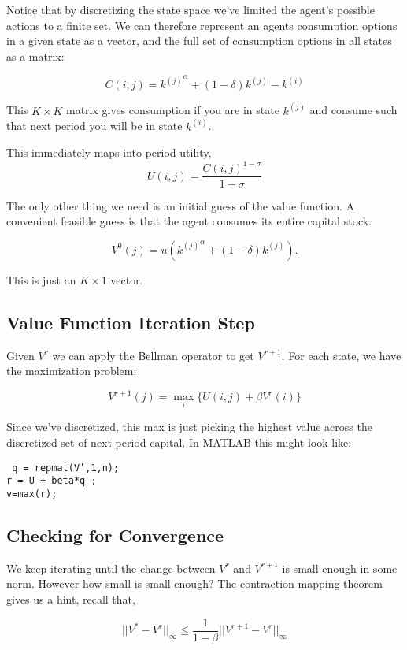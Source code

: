 \documentclass[twoside]{article}
\begin{document}
Notice that by discretizing the state space we've limited the agent's possible actions to a finite set. We can therefore represent an agents consumption options in a given state as a vector, and the full set of consumption options in all states as a matrix: 

$$C(i,j) = {k^{(j)}}^\alpha + (1-\delta)k^{(j)} - k^{(i)} $$

This $K \times K$ matrix gives consumption if you are in state $k^{(j)}$ and consume such that next period you will be in state $k^{(i)}$. 

This immediately maps into period utility, 
$$ U(i,j) = \frac{C(i,j)^{1-\sigma}}{1-\sigma}$$

The only other thing we need is an initial guess of the value function. A convenient feasible guess is that the agent consumes its entire capital stock:

$$V^0(j) = u({k^{(j)}}^\alpha + (1-\delta)k^{(j)} ).$$

This is just an $K \times 1$ vector. 

\subsection{Value Function Iteration Step} \label{sec:viter}

Given $V^r$ we can apply the Bellman operator to get $V^{r+1}$. For each state, we have the maximization problem: 

$$V^{r+1}(j) = \max_i \{ U(i,j) + \beta V^{r}(i) \} $$

Since we've discretized, this max is just picking the highest value across the discretized set of next period capital.  In MATLAB this might look like: 

{\tt 
q = repmat(V',1,n); \\
r = U + beta*q ; \\
v=max(r); \\
}

\subsection{Checking for Convergence}

We keep iterating until the change between $V^r$ and $V^{r+1}$ is small enough in some norm. However how small is small enough? 
The contraction mapping theorem gives us a hint, recall that, 

$$|| V^* - V^r ||_\infty \leq \frac{1}{1-\beta} ||V^{r+1} - V^r||_\infty $$
\end{document}
